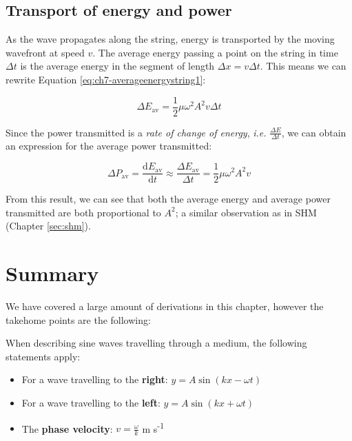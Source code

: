 \documentclass[
]{book}
\providecommand{\tightlist}{%
  \setlength{\itemsep}{0pt}\setlength{\parskip}{0pt}}
\begin{document}
\hypertarget{sec:ch7-transportenergypower}{%
\subsection{Transport of energy and power}\label{sec:ch7-transportenergypower}}

As the wave propagates along the string, energy is transported by the moving wavefront at speed \(v\). The average energy passing a point on the string in time \(\Delta t\) is the average energy in the segment of length \(\Delta x = v\Delta t\). This means we can rewrite Equation \eqref{eq:ch7-averageenergystring1}:

\begin{equation}
\Delta E_{\mathrm{av}} = \frac{1}{2}\mu \omega^2 A^2 v \Delta t
\label{eq:ch7-averageenergystring2}
\end{equation}

Since the power transmitted is a \emph{rate of change of energy}, \emph{i.e.} \(\frac{\Delta E}{\Delta t}\), we can obtain an expression for the average power transmitted:

\begin{equation}
\Delta P_{\mathrm{av}} = \frac{\mathrm{d} E_{\mathrm{av}}}{\mathrm{d}t} \approx \frac{\Delta E_{\mathrm{av}}}{\Delta t} = \frac{1}{2}\mu \omega^2 A^2 v
\label{eq:ch7-averagepowerstring1}
\end{equation}

From this result, we can see that both the average energy and average power transmitted are both proportional to \(A^2\); a similar observation as in SHM (Chapter \ref{sec:shm}).

\hypertarget{sec:ch7-summary}{%
\section{Summary}\label{sec:ch7-summary}}

We have covered a large amount of derivations in this chapter, however the takehome points are the following:

When describing sine waves travelling through a medium, the following statements apply:

\begin{itemize}
\tightlist
\item
  For a wave travelling to the \textbf{right}: \(y = A\sin(kx-\omega t)\)
\item
  For a wave travelling to the \textbf{left}: \(y = A\sin(kx+\omega t)\)
\item
  The \textbf{phase velocity}: \(v = \frac{\omega}{k}\) m s\textsuperscript{-1}
\end{itemize}
\end{document}

